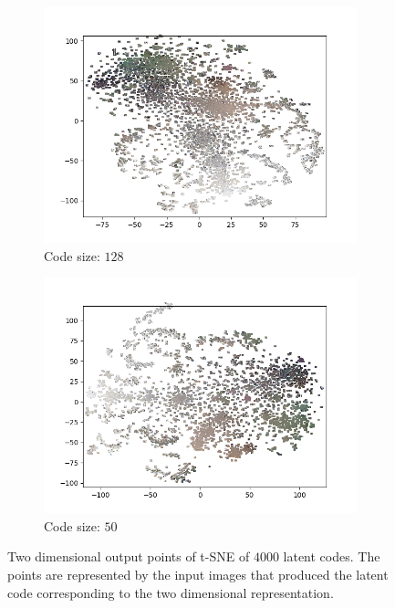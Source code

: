 \begin{figure}[H]
\begin{subfigure}{.5\textwidth}
        \centering
        \includegraphics[width=\textwidth]{images/figures/experiments_latent/pooling_dim128_images.png}   
        \caption{Code size: $128$}
    \end{subfigure}%
    \begin{subfigure}{.5\textwidth}
        \centering
        \includegraphics[width=\textwidth]{images/figures/experiments_latent/pooling_dim50_images.png}
        \caption{Code size: $50$}
    \end{subfigure}
    \caption{Two dimensional output points of t-SNE of $4000$ latent codes. The points are represented by the input
    images that produced the latent code corresponding to the two dimensional representation.}
    \label{figure_images_pooling_PCA}
\end{figure} 
